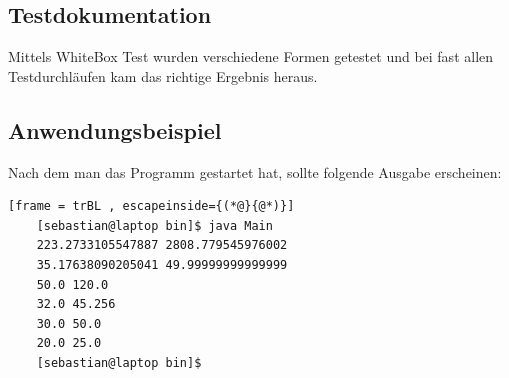 \subsection{Testdokumentation}
Mittels WhiteBox Test wurden verschiedene Formen getestet und bei fast allen Testdurchläufen kam das
richtige Ergebnis heraus.

\subsection{Anwendungsbeispiel}
Nach dem man das Programm gestartet hat, sollte folgende Ausgabe erscheinen:
\begin{lstlisting}[frame = trBL , escapeinside={(*@}{@*)}]
	[sebastian@laptop bin]$ java Main
	223.2733105547887 2808.779545976002
	35.17638090205041 49.99999999999999
	50.0 120.0
	32.0 45.256
	30.0 50.0
	20.0 25.0
	[sebastian@laptop bin]$ 
\end{lstlisting}